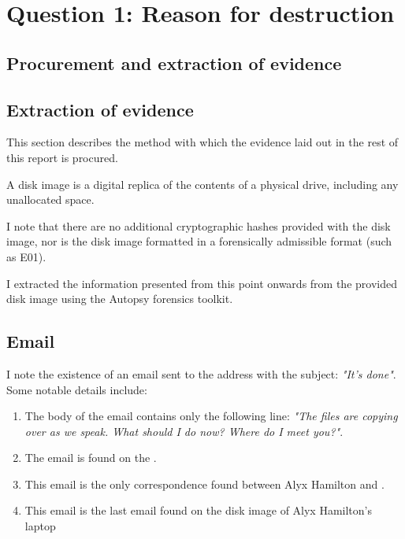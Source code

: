 \section{Question 1: Reason for destruction} %
\label{sec:question_reason_for_destruction}
\subsection{Procurement and extraction of evidence} %
\label{sub:procurement_and_extraction_of_evidence}

\subsection{Extraction of evidence} %
\label{sub:extraction_of_evidence}

\begin{myenum}
    \item This section describes the method with which the evidence laid out in the rest of this report is procured.
    \item A disk image is a digital replica of the contents of a physical drive, including any unallocated space.
    \item I note that there are no additional cryptographic hashes provided with the disk image, nor is the disk image formatted in a forensically admissible format (such as E01).
    \item I extracted the information presented from this point onwards from the provided disk image using the Autopsy forensics toolkit.
\end{myenum}


\subsection{Email} %
\label{sub:email}

\begin{myenum}
\item I note the existence of an email sent to the address  with the subject: \emph{"It's done"}. Some notable details include:
    \begin{enumerate}
        \item The body of the email contains only the following line: \emph{"The files are copying over as we speak. What should I do now? Where do I meet you?"}.
        \item The email is found on the .
        \item This email is the only correspondence found between Alyx Hamilton and .
        \item This email is the last email found on the disk image of Alyx Hamilton's laptop
    \end{enumerate}
\end{myenum}


